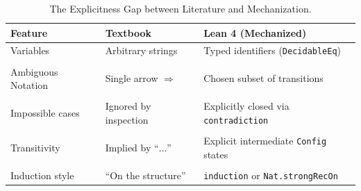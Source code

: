 \begin{table}[ht]
    \centering
    \small
    \caption{The Explicitness Gap between Literature and Mechanization.}
    \begin{tabular}{p{}p{}p{}}
        \textbf{Feature} & \textbf{Textbook~\citep{nielson_semantics_2007}} & \textbf{Lean 4 (Mechanized)} \\
        \hline
        Variables & Arbitrary strings & Typed identifiers (\texttt{DecidableEq}) \\  \\
        Ambiguous Notation & Single arrow $\Rightarrow$ & Chosen subset of transitions  \\  \\
        Impossible cases & Ignored by inspection & Explicitly closed via \texttt{contradiction} \\  \\
        Transitivity & Implied by ``$\dots$'' & Explicit intermediate \texttt{Config} states \\  \\
        Induction style & ``On the structure'' & \texttt{induction} or \texttt{Nat.strongRecOn} \\
    \end{tabular}
\end{table}